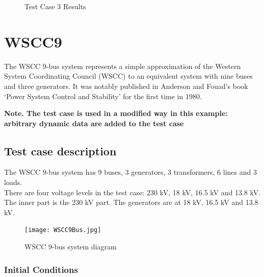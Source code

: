 \documentclass[a4paper, 12pt]{report}
\begin{document}
\begin{figure}[H]
\caption{Test Case 3 Results}
\end{figure}

\chapter{WSCC9}

The WSCC 9-bus system represents a simple approximation of the Western System Coordinating Council (WSCC) to an equivalent system with nine buses and three generators.
It was notably published in Anderson and Fouad’s book ‘Power System Control and Stability’ for the first time in 1980.

\textbf{Note. The test case is used in a modified way in this example: arbitrary dynamic data are added to the test case}

\section{Test case description}

The WSCC 9-bus system has 9 buses, 3 generators, 3 transformers, 6 lines and 3 loads.  \\
There are four voltage levels in the test case: 230 kV, 18 kV, 16.5 kV and 13.8 kV. The inner
part is the 230 kV part. The generators are at 18 kV, 16.5 kV and 13.8 kV.

\begin{figure}[H]
  \texttt{[image: WSCC9Bus.jpg]}
  \caption{WSCC 9-bus system diagram}
\end{figure}

\subsection{Initial Conditions}
\end{document}
